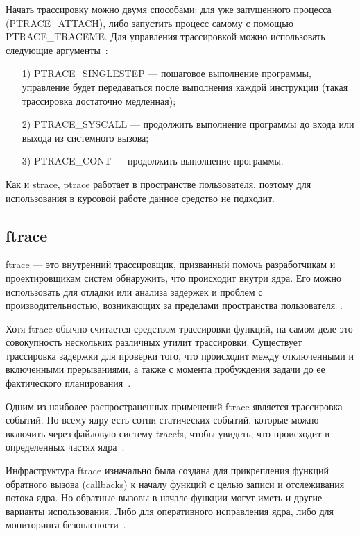\documentclass{bmstu}
\begin{document}
Начать трассировку можно двумя способами: для уже запущенного процесса (PTRACE\_ATTACH), либо запустить процесс самому с помощью PTRACE\_TRACEME. 
Для управления трассировкой можно использовать следующие аргументы~\cite{Ptrace}:
\begin{enumerate}
\item[1)] PTRACE\_SINGLESTEP --- пошаговое выполнение программы, управление будет передаваться после выполнения каждой инструкции (такая трассировка достаточно медленная);
\item[2)] PTRACE\_SYSCALL --- продолжить выполнение программы до входа или выхода из системного вызова;
\item[3)] PTRACE\_CONT --- продолжить выполнение программы.
\end{enumerate}

Как и strace, ptrace работает в пространстве пользователя, поэтому для использования в курсовой работе данное средство не подходит.

\subsection{ftrace}

ftrace --- это внутренний трассировщик, призванный помочь разработчикам и проектировщикам систем обнаружить, что происходит внутри ядра. 
Его можно использовать для отладки или анализа задержек и проблем с производительностью, возникающих за пределами пространства пользователя~\cite{Ftrace}.

Хотя ftrace обычно считается средством трассировки функций, на самом деле это совокупность нескольких различных утилит трассировки. 
Существует трассировка задержки для проверки того, что происходит между отключенными и включенными прерываниями, а также с момента пробуждения задачи до ее фактического планирования~\cite{Ftrace}.

Одним из наиболее распространенных применений ftrace является трассировка событий. 
По всему ядру есть сотни статических событий, которые можно включить через файловую систему tracefs, чтобы увидеть, что происходит в определенных частях ядра~\cite{Ftrace}.

Инфраструктура ftrace изначально была создана для прикрепления функций обратного вызова (callbacks) к началу функций с целью записи и отслеживания потока ядра. 
Но обратные вызовы в начале функции могут иметь и другие варианты использования. 
Либо для оперативного исправления ядра, либо для мониторинга безопасности~\cite{Ftrace}.
\end{document}

